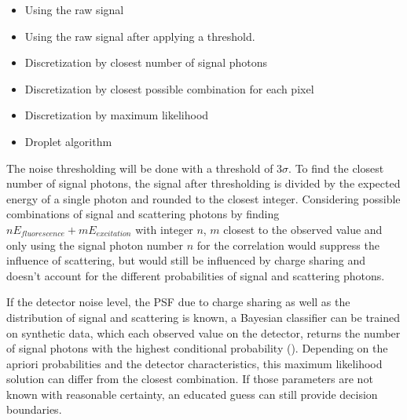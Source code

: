 \begin{itemize}
	\item Using the raw signal
	\item Using the raw signal after applying a threshold.
	\item Discretization by closest number of signal photons
	\item Discretization by closest possible combination for each pixel
	\item Discretization by maximum likelihood
	\item Droplet algorithm
\end{itemize}
The noise thresholding will be done with a threshold of 3$\sigma$. To find the closest number of signal photons, the signal after thresholding is divided by the expected energy of a single photon and rounded to the closest integer. Considering possible combinations of signal and scattering photons by finding  $nE_{fluorescence}+mE_{excitation}$ with integer $n$, $m$ closest to the observed value and only using the signal photon number $n$ for the correlation would suppress the influence of scattering, but would still be influenced by charge sharing and doesn't account for the different probabilities of signal and scattering photons.

If the detector noise level, the PSF due to charge sharing as well as the distribution of signal and scattering is known, a Bayesian classifier can be trained on synthetic data, which each observed value on the detector, returns the number of signal photons with the highest conditional probability (). Depending on the apriori probabilities and the detector characteristics, this maximum likelihood solution can differ from the closest combination. If those parameters are not known with reasonable certainty, an educated guess can still provide decision boundaries.


